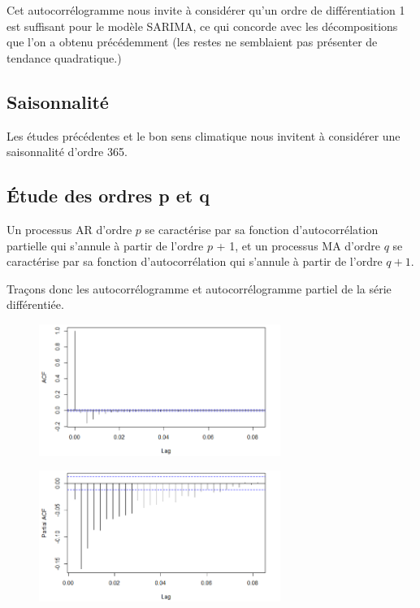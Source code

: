 \documentclass[../report.tex]{subfiles}
\begin{document}
\par Cet autocorrélogramme nous invite à considérer qu’un ordre de différentiation 1 est suffisant pour le modèle SARIMA, ce qui concorde avec les décompositions que l’on a obtenu précédemment (les restes ne semblaient pas présenter de tendance quadratique.)

\subsection{Saisonnalité}

\par Les études précédentes et le bon sens climatique nous invitent à considérer une saisonnalité d’ordre 365.

\subsection{Étude des ordres p et q}

\par Un processus AR d’ordre $p$ se caractérise par sa fonction d’autocorrélation partielle qui s’annule à partir de l’ordre $p$ + 1, et un processus MA d’ordre $q$ se caractérise par sa fonction d’autocorrélation qui s’annule à partir de l’ordre $q + 1$.

\par Traçons donc les autocorrélogramme et autocorrélogramme partiel de la série différentiée.

\begin{figure}[H]
  \centering
    \includegraphics[width=0.7\textwidth]{images/part_1/autocorr3.png}
\end{figure}

\begin{figure}[H]
  \centering
    \includegraphics[width=0.7\textwidth]{images/part_1/autocorr4.png}
\end{figure}
\end{document}
